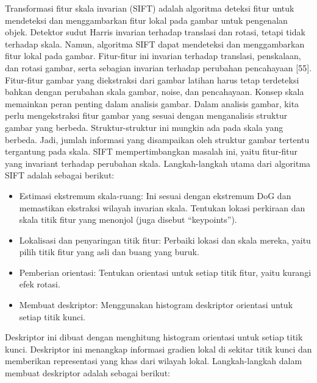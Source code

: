 \documentclass[
  letterpaper,
  DIV=11,
  numbers=noendperiod]{scrreprt}
\providecommand{\tightlist}{%
  \setlength{\itemsep}{0pt}\setlength{\parskip}{0pt}}\usepackage{longtable,booktabs,array}
\begin{document}
Transformasi fitur skala invarian (SIFT) adalah algoritma deteksi fitur
untuk mendeteksi dan menggambarkan fitur lokal pada gambar untuk
pengenalan objek. Detektor sudut Harris invarian terhadap translasi dan
rotasi, tetapi tidak terhadap skala. Namun, algoritma SIFT dapat
mendeteksi dan menggambarkan fitur lokal pada gambar. Fitur-fitur ini
invarian terhadap translasi, penskalaan, dan rotasi gambar, serta
sebagian invarian terhadap perubahan pencahayaan {[}55{]}. Fitur-fitur
gambar yang diekstraksi dari gambar latihan harus tetap terdeteksi
bahkan dengan perubahan skala gambar, noise, dan pencahayaan. Konsep
skala memainkan peran penting dalam analisis gambar. Dalam analisis
gambar, kita perlu mengekstraksi fitur gambar yang sesuai dengan
menganalisis struktur gambar yang berbeda. Struktur-struktur ini mungkin
ada pada skala yang berbeda. Jadi, jumlah informasi yang disampaikan
oleh struktur gambar tertentu tergantung pada skala. SIFT
mempertimbangkan masalah ini, yaitu fitur-fitur yang invariant terhadap
perubahan skala. Langkah-langkah utama dari algoritma SIFT adalah
sebagai berikut:

\begin{itemize}
\tightlist
\item
  Estimasi ekstremum skala-ruang: Ini sesuai dengan ekstremum DoG dan
  memastikan ekstraksi wilayah invarian skala. Tentukan lokasi perkiraan
  dan skala titik fitur yang menonjol (juga disebut ``keypoints'').\\
\item
  Lokalisasi dan penyaringan titik fitur: Perbaiki lokasi dan skala
  mereka, yaitu pilih titik fitur yang asli dan buang yang buruk.\\
\item
  Pemberian orientasi: Tentukan orientasi untuk setiap titik fitur,
  yaitu kurangi efek rotasi.\\
\item
  Membuat deskriptor: Menggunakan histogram deskriptor orientasi untuk
  setiap titik kunci.
\end{itemize}

Deskriptor ini dibuat dengan menghitung histogram orientasi untuk setiap
titik kunci. Deskriptor ini menangkap informasi gradien lokal di sekitar
titik kunci dan memberikan representasi yang khas dari wilayah lokal.
Langkah-langkah dalam membuat deskriptor adalah sebagai berikut:
\end{document}
